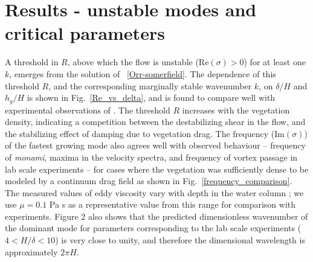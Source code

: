 \documentclass{jfm}
\newcommand{\hg}{h_g}
\renewcommand{\Rey}{{R}}
\newcommand{\monami}{\textit{monami}}
\newcommand{\revise}[1]{{{#1}}}
\begin{document}
\section{Results - unstable modes and critical parameters}
A threshold in $\Rey$, above which the flow is unstable (Re$(\sigma)>0$) for at least one $k$, emerges from the solution of ~\eqref{Orr-somerfield}. 
The dependence of this threshold $\Rey$, and the corresponding marginally stable wavenumber $k$, on $\delta/H$ and $\hg/H$ is shown in Fig.~\ref{Re_vs_delta}, and is found to compare well with experimental observations of \cite{Ghisal02}.
The threshold $\Rey$ increases with the vegetation density, indicating a competition between the destabilizing shear in the flow, and the stabilizing effect of damping due to vegetation drag.
The frequency (Im$(\sigma)$) of the fastest growing mode also agrees well with observed behaviour -- frequency of \monami, maxima in the velocity spectra, and frequency of vortex passage in lab scale experiments \citep{Ghisal02} -- for cases where the vegetation was sufficiently dense to be modeled by a continuum drag field as shown in Fig.~\ref{frequency_comparison}.
\revise{ The measured values of eddy viscosity vary with depth in the water column \citep{Nepf04}; we use $\mu= 0.1$ Pa s as a representative value from this range for comparison with experiments.}
\revise{Figure 2 also shows that the predicted dimensionless wavenumber of the dominant mode for parameters corresponding to the lab scale experiments ($4<H/\delta<10$) is very close to unity, and therefore the dimensional wavelength is approximately $2\pi H$.}
\end{document}
